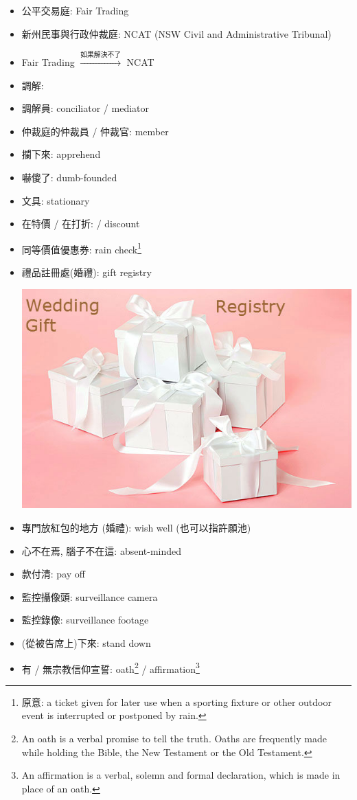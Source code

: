 \begin{multicols}{2}
\begin{itemize}
  \itemsep0em
  \item 公平交易庭: Fair Trading
  \item 新州民事與行政仲裁庭: NCAT (NSW Civil and Administrative Tribunal)
  \item Fair Trading $\xrightarrow{\text{如果解決不了}}$ NCAT
  \item 調解: 
  \item 調解員: conciliator / mediator
  \item 仲裁庭的仲裁員 / 仲裁官: member
  \item 攔下來: apprehend
  \item 嚇傻了: dumb-founded
  \item 文具: stationary
  \item 在特價 / 在打折:  / discount
  \item 同等價值優惠券: rain check\footnote{原意: a ticket given for later use when a sporting fixture or other outdoor event is interrupted or postponed by rain.}
  \item 禮品註冊處(婚禮): gift registry
  \begin{center}
    \includegraphics[scale=.4]{pics/gift-registry}
  \end{center}
  \item 專門放紅包的地方 (婚禮): wish well (也可以指許願池)
  \item 心不在焉, 腦子不在這: absent-minded
  \item {}款付清: pay off
  \item 監控攝像頭: surveillance camera
  \item 監控錄像: surveillance footage
  \item (從被告席上)下來: stand down
  \item 有 / 無宗教信仰宣誓: oath\footnote{An oath is a verbal promise to tell the truth. Oaths are frequently made while holding the Bible, the New Testament or the Old Testament.} / affirmation\footnote{An affirmation is a verbal, solemn and formal declaration, which is made in place of an oath.}
\end{itemize}
\end{multicols}

